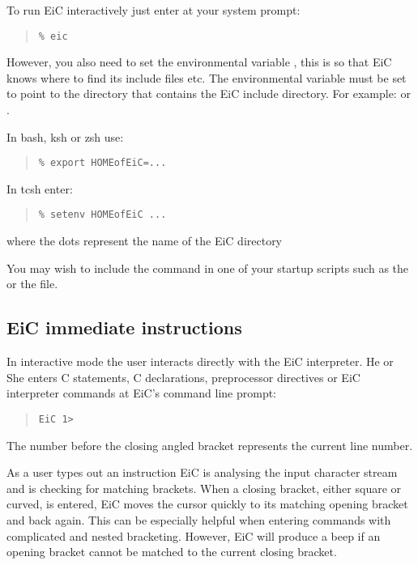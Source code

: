 To run EiC interactively just enter  at your system
prompt:
\begin{quote}
\begin{verbatim}
% eic
\end{verbatim}
\end{quote}

However, you also need to set the environmental variable
, this is so that EiC knows where to find
its include files etc.  The
 environmental variable must be set to point to the directory
that contains the EiC include directory. For example:  or
.

In bash, ksh or zsh use:
\begin{quote}
\begin{verbatim}
% export HOMEofEiC=...
\end{verbatim}
\end{quote}

In tcsh enter:
\begin{quote}
\begin{verbatim}
% setenv HOMEofEiC ...
\end{verbatim}
\end{quote}

where the dots represent the name of the EiC directory

You may wish to include the command in one of your startup scripts
such as the  or the  file.

\subsection{EiC immediate instructions}
\label{sec:ImmediateStatements}

In interactive mode the user interacts directly with the EiC
interpreter.  He or She enters C statements, C declarations,
preprocessor directives or EiC interpreter commands at
EiC's command line prompt:

\begin{quote}
\begin{verbatim}
EiC 1> 
\end{verbatim}
\end{quote}

The number before the closing angled bracket represents the current
line number.  

As a user types out an instruction EiC is analysing the input
character stream and is checking for matching brackets. When a
closing bracket, either square or curved, is entered, EiC moves the
cursor quickly to its matching opening bracket and back again. This
can be especially helpful when entering commands with complicated and
nested bracketing. However, EiC will produce a beep if an opening
bracket cannot be matched to the current closing bracket.

